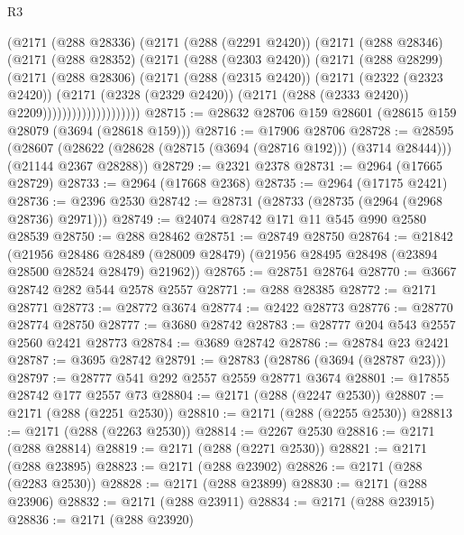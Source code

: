 \begin{lexlean}{R3}
\begin{coremodule}
                      (@2171
                        (@288 @28336)
                        (@2171
                          (@288 (@2291 @2420))
                          (@2171
                            (@288 @28346)
                            (@2171
                              (@288 @28352)
                              (@2171
                                (@288 (@2303 @2420))
                                (@2171
                                  (@288 @28299)
                                  (@2171
                                    (@288 @28306)
                                    (@2171
                                      (@288 (@2315 @2420))
                                      (@2171
                                        (@2322 (@2323 @2420))
                                        (@2171
                                          (@2328 (@2329 @2420))
                                          (@2171 (@288 (@2333 @2420)) @2209))))))))))))))))))))
@28715 := @28632 @28706 @159 @28601 (@28615 @159 @28079 (@3694 (@28618 @159)))
@28716 := @17906 @28706
@28728 := @28595
    (@28607 (@28622 (@28628 (@28715 (@3694 (@28716 @192))) (@3714 @28444))) (@21144 @2367 @28288))
@28729 := @2321 @2378
@28731 := @2964 (@17665 @28729)
@28733 := @2964 (@17668 @2368)
@28735 := @2964 (@17175 @2421)
@28736 := @2396 @2530
@28742 := @28731 (@28733 (@28735 (@2964 (@2968 @28736) @2971)))
@28749 := @24074 @28742 @171 @11 @545 @990 @2580 @28539
@28750 := @288 @28462
@28751 := @28749 @28750
@28764 := @21842
    (@21956
      @28486
      @28489
      (@28009 @28479)
      (@21956 @28495 @28498 (@23894 @28500 @28524 @28479) @21962))
@28765 := @28751 @28764
@28770 := @3667 @28742 @282 @544 @2578 @2557
@28771 := @288 @28385
@28772 := @2171 @28771
@28773 := @28772 @3674
@28774 := @2422 @28773
@28776 := @28770 @28774 @28750
@28777 := @3680 @28742
@28783 := @28777 @204 @543 @2557 @2560 @2421 @28773
@28784 := @3689 @28742
@28786 := @28784 @23 @2421
@28787 := @3695 @28742
@28791 := @28783 (@28786 (@3694 (@28787 @23)))
@28797 := @28777 @541 @292 @2557 @2559 @28771 @3674
@28801 := @17855 @28742 @177 @2557 @73
@28804 := @2171 (@288 (@2247 @2530))
@28807 := @2171 (@288 (@2251 @2530))
@28810 := @2171 (@288 (@2255 @2530))
@28813 := @2171 (@288 (@2263 @2530))
@28814 := @2267 @2530
@28816 := @2171 (@288 @28814)
@28819 := @2171 (@288 (@2271 @2530))
@28821 := @2171 (@288 @23895)
@28823 := @2171 (@288 @23902)
@28826 := @2171 (@288 (@2283 @2530))
@28828 := @2171 (@288 @23899)
@28830 := @2171 (@288 @23906)
@28832 := @2171 (@288 @23911)
@28834 := @2171 (@288 @23915)
@28836 := @2171 (@288 @23920)

\end{coremodule}
\end{lexlean}
